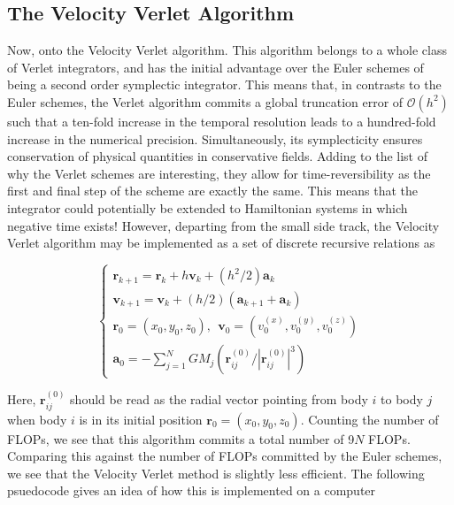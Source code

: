 	\subsection{The Velocity Verlet Algorithm}
	
	Now, onto the Velocity Verlet algorithm. This algorithm belongs to a whole class of Verlet integrators, and has the initial advantage over the Euler schemes of being a second order symplectic integrator. This means that, in contrasts to the Euler schemes, the Verlet algorithm commits a global truncation error of $\mathcal{O}(h^2)$ such that a ten-fold increase in the temporal resolution leads to a hundred-fold increase in the numerical precision. Simultaneously, its symplecticity ensures conservation of physical quantities in conservative fields. Adding to the list of why the Verlet schemes are interesting, they allow for time-reversibility as the first and final step of the scheme are exactly the same. This means that the integrator could potentially be extended to Hamiltonian systems in which negative time exists! However, departing from the small side track, the Velocity Verlet algorithm may be implemented as a set of discrete recursive relations as
	
		\begin{equation}
	\begin{cases}
	
	\mathbf{r}_{k+1} = \mathbf{r}_k + h\mathbf{v}_{k} + (h^2/2)\mathbf{a}_k\\
	\mathbf{v}_{k+1} = \mathbf{v}_k + (h/2)\left(\mathbf{a}_{k+1} + \mathbf{a}_k\right)\\
	\mathbf{r}_0 = (x_0, y_0,z_0),\ \ \mathbf{v}_0 = (v^{(x)}_0, v^{(y)}_0,v^{(z)}_0)\\
	\mathbf{a}_0 = -\sum_{j=1}^{N}GM_j(\mathbf{r}^{(0)}_{ij}/|\mathbf{r}^{(0)}_{ij}|^3)
	\end{cases}
	\label{vv}
	\end{equation}
	
	Here, $\mathbf{r}^{(0)}_{ij}$ should be read as the radial vector pointing from body $i$ to body $j$ when body $i$ is in its initial position $\mathbf{r}_0 = (x_0,y_0,z_0)$. Counting the number of FLOPs, we see that this algorithm commits a total number of 9$N$ FLOPs. Comparing this against the number of FLOPs committed by the Euler schemes, we see that the Velocity Verlet method is slightly less efficient. The following psuedocode gives an idea of how this is implemented on a computer\\
	
